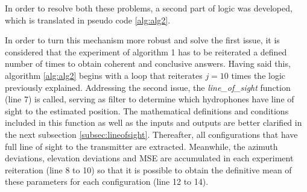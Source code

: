 In order to resolve both these problems, a second part of logic was developed, which is translated in pseudo code \ref{alg:alg2}.

In order to turn this mechanism more robust and solve the first issue, it is considered that the experiment of algorithm 1 has to be reiterated a defined number of times to obtain coherent and conclusive answers. Having said this, algorithm \ref{alg:alg2} begins with a loop that reiterates $j = 10$ times the logic previously explained. Addressing the second issue, the \textit{line\_of\_sight} function (line 7) is called, serving as filter to determine which hydrophones have line of sight to the estimated position. The mathematical definitions and conditions included in this function as well as the inputs and outputs are better clarified in the next subsection \ref{subsec:lineofsight}. Thereafter, all configurations that have full line of sight to the transmitter are extracted. Meanwhile, the azimuth deviations, elevation deviations and MSE are accumulated in each experiment reiteration (line 8 to 10) so that it is possible to obtain the definitive mean of these parameters for each configuration (line 12 to 14). 

